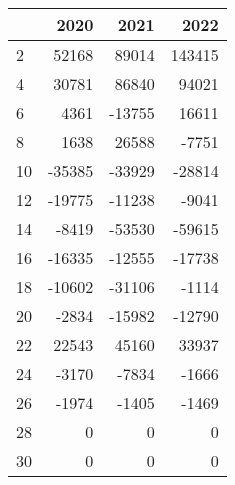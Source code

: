 \begin{tabular}{lrrr}
\toprule
{} &   2020 &   2021 &    2022 \\
\midrule
2  &  52168 &  89014 &  143415 \\
4  &  30781 &  86840 &   94021 \\
6  &   4361 & -13755 &   16611 \\
8  &   1638 &  26588 &   -7751 \\
10 & -35385 & -33929 &  -28814 \\
12 & -19775 & -11238 &   -9041 \\
14 &  -8419 & -53530 &  -59615 \\
16 & -16335 & -12555 &  -17738 \\
18 & -10602 & -31106 &   -1114 \\
20 &  -2834 & -15982 &  -12790 \\
22 &  22543 &  45160 &   33937 \\
24 &  -3170 &  -7834 &   -1666 \\
26 &  -1974 &  -1405 &   -1469 \\
28 &      0 &      0 &       0 \\
30 &      0 &      0 &       0 \\
\bottomrule
\end{tabular}
